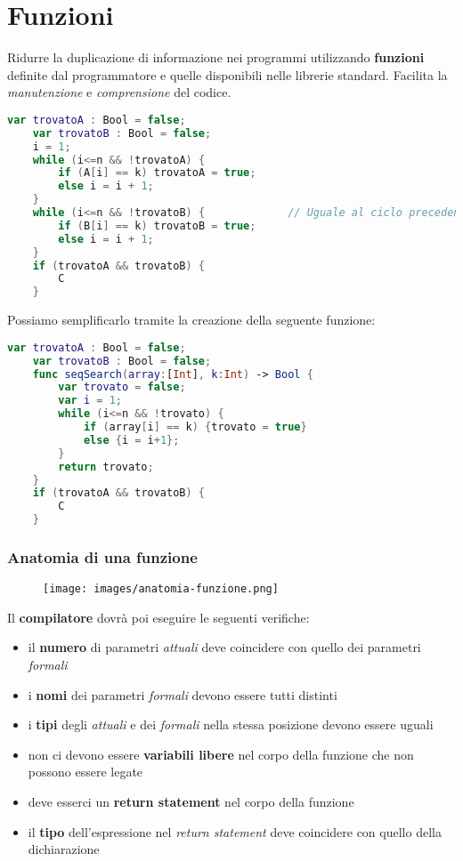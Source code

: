 \section{Funzioni}
\begin{definition}
	Ridurre la duplicazione di informazione nei programmi utilizzando \textbf{funzioni} definite dal programmatore e quelle disponibili nelle librerie standard. Facilita la \emph{manutenzione} e \emph{comprensione} del codice.
\end{definition}
\begin{lstlisting}[language=Swift, caption=Esempio di codice astraibile, mathescape=true]
	var trovatoA : Bool = false;
	var trovatoB : Bool = false;
	i = 1;
	while (i<=n && !trovatoA) {
		if (A[i] == k) trovatoA = true;
		else i = i + 1;
	}
	while (i<=n && !trovatoB) {				// Uguale al ciclo precedente se non per l'array
		if (B[i] == k) trovatoB = true;
		else i = i + 1;
	}
	if (trovatoA && trovatoB) {
		C
	}
\end{lstlisting}
Possiamo semplificarlo tramite la creazione della seguente funzione:
\begin{lstlisting}[language=Swift, caption=Esempio di funzione, mathescape=true]
	var trovatoA : Bool = false;
	var trovatoB : Bool = false;
	func seqSearch(array:[Int], k:Int) -> Bool {
		var trovato = false;
		var i = 1;
		while (i<=n && !trovato) {
			if (array[i] == k) {trovato = true}
			else {i = i+1};
		}
		return trovato;
	}
	if (trovatoA && trovatoB) {
		C
	}
\end{lstlisting}
\subsubsection{Anatomia di una funzione}
\begin{figure}[h!]
	\centering
	\texttt{[image: images/anatomia-funzione.png]}
	\caption{}
\end{figure}
Il \textbf{compilatore} dovrà poi eseguire le seguenti verifiche:
\begin{itemize}
	\item il \textbf{numero} di parametri \emph{attuali} deve coincidere con quello dei parametri \emph{formali}
	\item i \textbf{nomi} dei parametri \emph{formali} devono essere tutti distinti
	\item i \textbf{tipi} degli \emph{attuali} e dei \emph{formali} nella stessa posizione devono essere uguali
	\item non ci devono essere \textbf{variabili libere} nel corpo della funzione che non possono essere legate
	\item deve esserci un \textbf{return statement} nel corpo della funzione
	\item il \textbf{tipo} dell'espressione nel \emph{return statement} deve coincidere con quello della dichiarazione
\end{itemize}
